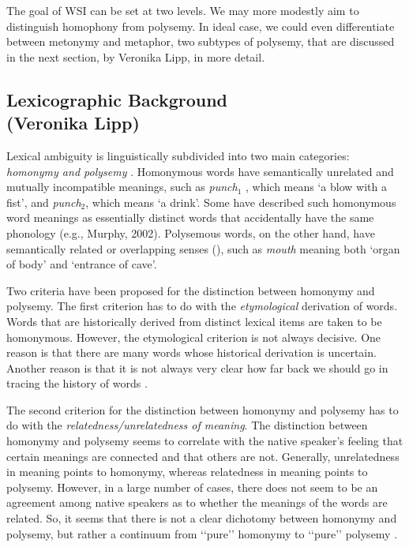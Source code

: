 \documentclass[11pt]{article}
\begin{document}

The goal of WSI can be set at two levels. We may more modestly aim to
distinguish homophony from polysemy. In ideal case, we could even differentiate
between metonymy and metaphor, two subtypes of polysemy, that are discussed in
the next section, by Veronika Lipp, in more detail.  

\subsection{Lexicographic Background \\ (Veronika Lipp)}

\label{sec:bground}

Lexical ambiguity is linguistically subdivided into two main categories:
\emph{homonymy and polysemy} \citep{Cruse:2004}. Homonymous words have
semantically unrelated and mutually incompatible meanings, such as
\emph{punch$_1$} , which means `a blow with a fist', and \emph{punch$_2$},
which means `a drink'. Some have described such homonymous word meanings as
essentially distinct words that accidentally have the same phonology (e.g.,
Murphy, 2002). Polysemous words, on the other hand, have semantically related
or overlapping senses (\cite{Cruse:2004,Jackendoff:2002, Pustejovsky:1995}),
such as \emph{mouth} meaning both `organ of body' and `entrance of cave'.

Two criteria have been proposed for the distinction between homonymy and
polysemy. The first criterion has to do with the \emph{etymological} derivation
of words. Words that are historically derived from distinct lexical items are
taken to be homonymous. However, the etymological criterion is not always
decisive. One reason is that there are many words whose historical derivation
is uncertain. Another reason is that it is not always very clear how far back
we should go in tracing the history of words \citep{Lyons:1977}.

The second criterion for the distinction between homonymy and polysemy has to
do with the \emph{relatedness/unrelatedness of meaning}.  The distinction
between homonymy and polysemy seems to correlate with the native speaker’s
feeling that certain meanings are connected and that others are not. Generally,
unrelatedness in meaning points to homonymy, whereas relatedness in meaning
points to polysemy.  However, in a large number of cases, there does not seem
to be an agreement among native speakers as to whether the meanings of the
words are related. So, it seems that there is not a clear dichotomy between
homonymy and polysemy, but rather a continuum from ‘‘pure’’ homonymy to
‘‘pure’’ polysemy \citep{Lyons:1977}.
\end{document}
